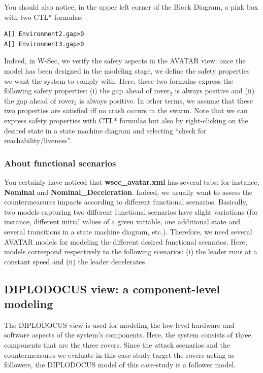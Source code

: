 \documentclass{article}
\begin{document}
You should also notice, in the upper left corner of the Block Diagram, a pink box with two CTL* formulas:
\begin{verbatim}
A[] Environment2.gap>0
A[] Environment3.gap>0
\end{verbatim}
Indeed, in W-Sec, we verify the safety aspects in the AVATAR view: once the model has been designed in the modeling stage, we define the safety properties we want the system to comply with. Here, these two formulas express the following safety properties: (i) the gap ahead of rover$_2$ is always positive and (ii) the gap ahead of rover$_3$ is always positive. In other terms, we assume that these two properties are satisfied iff no crash occurs in the swarm. Note that we can express safety properties with CTL* formulas but also by right-clicking on the desired state in a state machine diagram and selecting ``check for reachability/liveness''.

\subsubsection{About functional scenarios}

You certainly have noticed that \textbf{wsec\_avatar.xml} has several tabs: for instance, \textbf{Nominal} and \textbf{Nominal\_Deceleration}. Indeed, we usually want to assess the countermeasures impacts according to different functional scenarios. Basically, two models capturing two different functional scenarios have slight variations (for instance, different initial values of a given variable, one additional state and several transitions in a state machine diagram, etc.). Therefore, we need several AVATAR models for modeling the different desired functional scenarios. Here, models correspond respectively to the following scenarios: (i) the leader runs at a constant speed and (ii) the leader decelerates.


\subsection{DIPLODOCUS view: a component-level modeling}

The DIPLODOCUS view is used for modeling the low-level hardware and software aspects of the system's components. Here, the system consists of three components that are the three rovers. Since the attack scenarios and the countermeasures we evaluate in this case-study target the rovers acting as followers, the DIPLODOCUS model of this case-study is a follower model.
\end{document}
